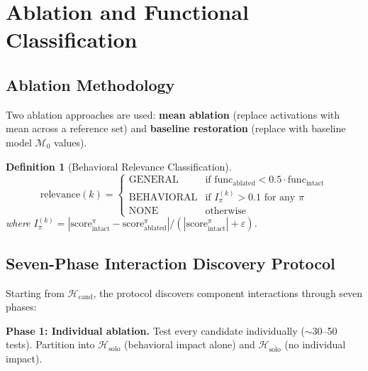 \documentclass[11pt]{article}
\newtheorem{definition}{Definition}[section]
\begin{document}
\section{Ablation and Functional Classification}
\label{sec:ablation}

\subsection{Ablation Methodology}

Two ablation approaches are used: \textbf{mean ablation} (replace activations with mean across a reference set) and \textbf{baseline restoration} (replace with baseline model $\mathcal{M}_0$ values).

\begin{definition}[Behavioral Relevance Classification]
\begin{equation}
\text{relevance}(k) = \begin{cases}
\text{GENERAL} & \text{if } \text{func}_{\text{ablated}} < 0.5 \cdot \text{func}_{\text{intact}} \\
\text{BEHAVIORAL} & \text{if } I^{(k)}_\pi > 0.1 \text{ for any } \pi \\
\text{NONE} & \text{otherwise}
\end{cases}
\end{equation}
where $I^{(k)}_\pi = |\text{score}^\pi_{\text{intact}} - \text{score}^\pi_{\text{ablated}}| / (|\text{score}^\pi_{\text{intact}}| + \varepsilon)$.
\end{definition}

\subsection{Seven-Phase Interaction Discovery Protocol}

Starting from $\mathcal{H}_{\text{cand}}$, the protocol discovers component interactions through seven phases:

\textbf{Phase 1: Individual ablation.} Test every candidate individually ($\sim$30--50 tests). Partition into $\mathcal{H}_{\text{solo}}$ (behavioral impact alone) and $\mathcal{H}_{\overline{\text{solo}}}$ (no individual impact).
\end{document}
